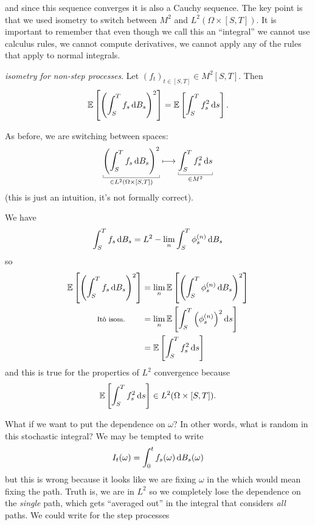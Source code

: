 \documentclass[12pt]{report}
\begin{document}
and since this sequence converges it is also a Cauchy sequence. The key point is that we used \ito{} isometry to switch between $M^{2}$ and $L^{2}(\Omega\times[S,T])$. It is important to remember that even though we call this an ``integral'' we cannot use calculus rules, we cannot compute derivatives, we cannot apply any of the rules that apply to normal integrals.
\begin{theorem}
	\emph{\ito{} isometry for non-step processes}. Let ${(f_{t})}_{t\in[S,T]}\in M^{2}[S,T]$. Then
	\begin{equation*}
		\ev{\left(\int_{S}^{T}f_{s}\dbs\right)^{2}}=\ev{\int_{S}^{T}f_{s}^{2}\ds}.
	\end{equation*}
\end{theorem}
As before, we are switching between spaces:
\begin{equation*}
	\ubracketthin{\left(\int_{S}^{T}f_{s}\dbs\right)^{2}}_{\in L^{2}(\Omega\times[S,T])}\longmapsto\ubracketthin{\int_{S}^{T}f_{s}^{2}\ds}_{\in M^{2}}
\end{equation*}
(this is just an intuition, it's not formally correct).
\begin{fancyproof}
	We have
	\begin{equation*}
		\int_{S}^{T}f_{s}\dbs=L^{2}-\lim_{n}\int_{S}^{T}\phi_{s}^{(n)}\dbs
	\end{equation*}
	so
	\begin{align*}
	\ev{\left(\int_{S}^{T}f_{s}\dbs\right)^{2}}&=\lim_{n}\ev{\left(\int_{S}^{T}\phi_{s}^{(n)}\dbs\right)^{2}}\\
	\text{\footnotesize \ito{} isom.}\qquad&=\lim_{n}\ev{\int_{S}^{T}\left(\phi^{(n)}_{s}\right)^{2}\ds}\\
	&=\ev{\int_{S}^{T}f_{s}^{2}\ds}
	\end{align*}
	and this is true for the properties of $L^{2}$
 convergence because
 \begin{equation*}
 	\ev{\int_{S}^{T}f_{s}^{2}\ds}\in L^{2}(\Omega\times[S,T]).
 \end{equation*}
 \end{fancyproof}
What if we want to put the dependence on $\omega$? In other words, what is random in this stochastic integral? We may be tempted to write
\begin{equation*}
	I_{t}(\omega)=\int_{0}^{t}f_{s}(\omega)\dbs(\omega)
\end{equation*}
but this is wrong because it looks like we are fixing $\omega$ in the \bwm{} which would mean fixing the path. Truth is, we are in $L^{2}$ so we completely lose the dependence on the \textit{single} path, which gets ``averaged out'' in the integral that considers \textit{all} paths. We could write for the step processes
\end{document}
